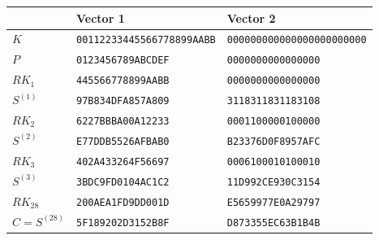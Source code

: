 \documentclass[pdflatex,sn-mathphys-num]{sn-jnl}
\theoremstyle{thmstyleone}
\theoremstyle{thmstylethree}
\theoremstyle{thmstyletwo}
\begin{document}
\begin{appendices}
\begin{center}\footnotesize
\begin{tabular}{lll}
\toprule
 & Vector 1 & Vector 2\\
\midrule
$K$ & \texttt{00112233445566778899AABB} & \texttt{000000000000000000000000}\\
$P$ & \texttt{0123456789ABCDEF} & \texttt{0000000000000000}\\
$RK_1$ & \texttt{445566778899AABB} & \texttt{0000000000000000}\\
$S^{(1)}$ & \texttt{97B834DFA857A809} & \texttt{3118311831183108}\\
$RK_2$ & \texttt{6227BBBA00A12233} & \texttt{0001100000100000}\\
$S^{(2)}$ & \texttt{E77DDB5526AFBAB0} & \texttt{B23376D0F8957AFC}\\
$RK_3$ & \texttt{402A433264F56697} & \texttt{0006100010100010}\\
$S^{(3)}$ & \texttt{3BDC9FD0104AC1C2} & \texttt{11D992CE930C3154}\\
$RK_{28}$ & \texttt{200AEA1FD9DD001D} & \texttt{E5659977E0A29797}\\
$C=S^{(28)}$ & \texttt{5F189202D3152B8F} & \texttt{D873355EC63B1B4B}\\
\bottomrule
\end{tabular}
\end{center}

\end{appendices}


\end{document}
